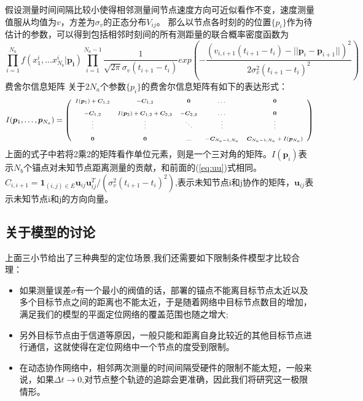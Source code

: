 假设测量时间间隔比较小使得相邻测量间节点速度方向可近似看作不变，速度测量值服从均值为$v$，方差为$\sigma_{v}$的正态分布$V_{ij}$。
那么以节点各时刻的的位置$\{p_i\}$作为待估计的参数，可以得到包括相邻时刻间的所有测距量的联合概率密度函数为
\begin{equation}\label{eq:single}
\prod_{i=1}^{N_a} f(x^i_1,...x^{i}_{N_b}|\bm{p_i})
\prod_{i=1}^{N_a-1}\frac{1}{\sqrt{2\pi}\sigma_v(t_{i+1}-t_i)}
exp(-\frac{(v_{i,i+1}(t_{i+1}-t_i)-||\bm{p}_i-\bm{p}_{i+1}||)^2}{2\sigma_v^2(t_{i+1}-t_i)^2})
\end{equation}
{费舍尔信息矩阵}
关于$2N_a$个参数$\{p_i\}$的费舍尔信息矩阵有如下的表达形式：
\begin{equation}\label{eq:time_cooperation_matrix}
\scriptsize{
I(\bm{p}_1,\dots,\bm{p}_{N_a})=
\left(
\begin{array}{ccccc}
I(\bm{p}_1)+\bm{C}_{1,2}&-\bm{C}_{1,2}&\bm{0}&\dots&\bm{0}\\
&&&&\\
-\bm{C}_{1,2} & I(\bm{p}_2)+\bm{C}_{1,2}+\bm{C}_{2,3}&-\bm{C}_{2,3}&\dots&\bm{0}\\
\vdots &\vdots&\ddots &\vdots&\vdots\\
&&&&\\
\bm{0}&\bm{0}&...& -\bm{C}_{N_a-1,N_a}&\bm{C}_{N_a-1,N_a}+I(\bm{p}_{N_a})\\
\end{array}
\right)
}
\end{equation}
上面的式子中若将2乘2的矩阵看作单位元素，则是一个三对角的矩阵。$I(\bm{p}_i)$表示$N_b$个锚点对未知节点距离测量的贡献，和前面的(\ref{eq:uu})式相同。$C_{i,i+1}=\bm{1}_{(i,j)\in E}\bm{u}_{ij}\bm{u}_{ij}^T/(\sigma_v^2(t_{i+1}-t_i)^2)$,表示未知节点i和j协作的矩阵，$\bm{u}_{ij}$表示未知节点i和j的方向向量。
\subsection{关于模型的讨论}
上面三小节给出了三种典型的定位场景,我们还需要如下限制条件模型才比较合理：
\begin{itemize}
  \item 如果测量误差$\sigma$有一个最小的阀值的话，部署的锚点不能离目标节点太近以及多个目标节点之间的距离也不能太近，于是随着网络中目标节点数目的增加，满足我们的模型的平面定位网络的覆盖范围也随之增大;
  \item 另外目标节点由于信道等原因，一般只能和距离自身比较近的其他目标节点进行通信，这就使得在定位网络中一个节点的度受到限制。
  \item 在动态协作网络中，相邻两次测量的时间间隔受硬件的限制不能太短，一般来说，如果$\Delta t \to 0$,对节点整个轨迹的追踪会更准确，因此我们将研究这一极限情形。
\end{itemize}
